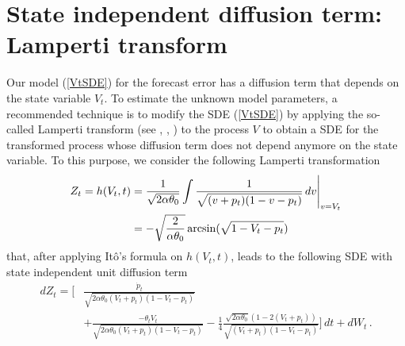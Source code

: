 \documentclass[11pt]{article}
\theoremstyle{definition}
\begin{document}


\section{State independent diffusion term: Lamperti transform} \label{Section_3}

Our model (\ref{VtSDE}) for the forecast error has a diffusion term that depends on the state variable $V_t$. To estimate the unknown model parameters, a recommended technique is to modify the SDE (\ref{VtSDE}) by applying the so-called Lamperti transform (see \cite[40--41]{iacus1}, \cite{moma}, \cite[98--100]{saso}) to the process $V$ to obtain a SDE for the transformed process whose diffusion term does not depend anymore on the state variable. To this purpose, we consider the following Lamperti transformation  
\begin{align}
Z_t = h(V_t, t)  & = \frac{1}{\sqrt{2 \alpha \theta_0 }} \int \frac{1}{\sqrt{(v + p_t)(1 - v - p_t)}} \,dv \Bigg{\vert}_{v = V_t}  \nonumber \\
& = - \sqrt{ \frac{2}{ \alpha \theta_0 }} \arcsin (\sqrt{ 1 - V_t - p_t}) \label{eq:LampZ}
\end{align}
that, after applying It\^{o}'s formula on $h(V_t, t)$, leads to the following SDE with state independent unit diffusion term
\begin{align}
dZ_t = \Bigg[  & \frac{\dot{p}_t}{ \sqrt{2 \alpha \theta_0 (V_t + p_t)(1 - V_t - p_t)}}  \nonumber \\ 
& + \frac{- \theta_t V_t}{ \sqrt{2  \alpha \theta_0 (V_t + p_t)(1 - V_t - p_t)}} - \frac{1}{4} \frac{\sqrt{2 \alpha \theta_0} \left( 1 - 2 (V_t + p_t)\right)}{\sqrt{(V_t + p_t)(1 - V_t - p_t)}}  \Bigg] \,dt + dW_t \,. \label{eq:stindepSDE}
\end{align}
\end{document}
